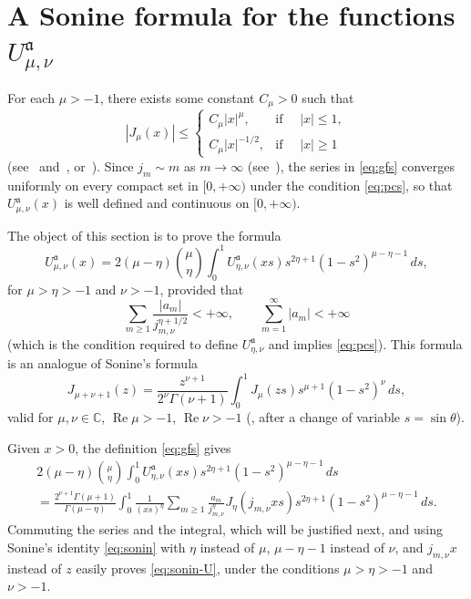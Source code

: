 \documentclass[10pt,a4paper]{article}
\numberwithin{equation}{section}
\theoremstyle{plain}
\theoremstyle{definition}
\newcommand{\aA}{\mathfrak{a}}
\newcommand{\CC}{\mathbb{C}}
\renewcommand{\Re}{\operatorname{Re}}
\begin{document}
\section{A Sonine formula for the functions $U_{\mu,\nu}^\aA$}
\label{sec:Sonine}

For each $\mu > -1$, there exists some constant $C_{\mu} > 0$ such that
\begin{equation}
\label{eq:cotaJa}
   | J_{\mu}(x) | \leq
   \begin{cases}
   C_{\mu} |x|^{\mu}, &\mbox{if } \quad |x| \leq 1,
   \\
   C_{\mu} |x|^{-1/2}, &\mbox{if } \quad |x| \geq 1
   \end{cases}
\end{equation}
(see~\cite[3.1(8), p.~40]{Wat} and~\cite[7.21(1), p.~199]{Wat}, or~\cite[formulas 10.7.3 and 10.7.8]{OlMa-NIST}). Since $j_m \sim m$ as $m \to \infty$ (see~\cite[\S\,15.53, p.~506]{Wat}), the series in \eqref{eq:gfs} converges uniformly on every compact set in $[0,+\infty)$ under the condition \eqref{eq:pcs}, so that $U_{\mu,\nu}^\aA(x)$ is well defined and continuous on $[0,+\infty)$.

The object of this section is to prove the formula
\begin{equation}
\label{eq:sonin-U}
   U_{\mu,\nu}^\aA(x) = 2(\mu-\eta)\binom{\mu}{\eta}
   \int_0^1 U_{\eta,\nu}^\aA(xs) s^{2\eta+1} (1-s^2)^{\mu-\eta-1} \, ds,
\end{equation}
for $\mu > \eta > -1$ and $\nu > -1$, provided that
\begin{equation}
\label{eq:pcs-eta}
   \sum_{m\geq 1} \frac{|a_m|}{j_{m,\nu}^{\eta + 1/2}} < +\infty,
   \qquad
   \sum _{m=1}^\infty |a_m| < +\infty
\end{equation}
(which is the condition required to define $U_{\eta,\nu}^\aA$ and implies \eqref{eq:pcs}).
This formula is an analogue of Sonine's formula
\begin{equation}
\label{eq:sonin}
   J_{\mu+\nu+1}(z) = \frac{z^{\nu+1}}{2^\nu \Gamma(\nu+1)}
   \int_0^1 J_\mu(zs) s^{\mu+1} (1-s^2)^\nu \, ds,
\end{equation}
valid for $\mu, \nu \in \CC$, $\Re \mu > -1$, $\Re \nu > -1$ (\cite[12.11(1), p.~373]{Wat}, after a change of variable $s = \sin \theta$).

Given $x > 0$, the definition \eqref{eq:gfs} gives
\begin{multline*}
   2(\mu-\eta)\binom{\mu}{\eta}
   \int_0^1 U_{\eta,\nu}^\aA(xs) s^{2\eta+1} (1-s^2)^{\mu-\eta-1} \, ds
   \\
   = \frac{2^{\nu+1}\Gamma(\mu+1)}{\Gamma(\mu-\eta)}
   \int_0^1
   \frac{1}{(xs)^\eta} \sum_{m\geq 1} \frac{a_m}{j_{m,\nu}^\eta} J_\eta(j_{m,\nu} xs)
   s^{2\eta+1} (1-s^2)^{\mu-\eta-1} \, ds.
\end{multline*}
Commuting the series and the integral, which will be justified next, and using Sonine's identity \eqref{eq:sonin} with $\eta$ instead of $\mu$, $\mu - \eta - 1$ instead of $\nu$, and $j_{m,\nu} x$ instead of $z$ easily proves \eqref{eq:sonin-U}, under the conditions $\mu > \eta > -1$ and $\nu > -1$.
\end{document}
